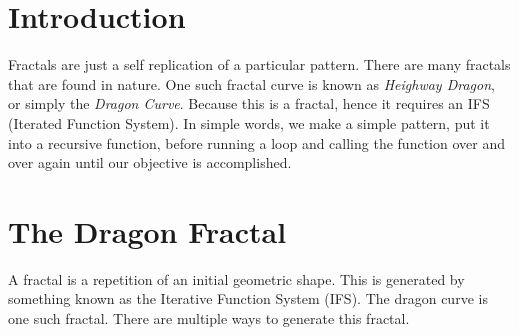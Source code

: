 \documentclass[cryptography,article,submit,moreauthors,pdftex]{Definitions/mdpi}
\begin{document}


\section{Introduction}
\begin{flushleft}
    Fractals are just a self replication of a particular pattern. There are many fractals that are found in nature. One such fractal curve is known as \textit{Heighway Dragon}, or simply the \textit{Dragon Curve}. Because this is a fractal, hence it requires an IFS (Iterated Function System). In simple words, we make a simple pattern, put it into a recursive function, before running a loop and calling the function over and over again until our objective is accomplished.
\end{flushleft}

\section{The Dragon Fractal}
\begin{flushleft}
        A fractal is a repetition of an initial geometric shape. This is generated by something known as the Iterative Function System (IFS). The dragon curve is one such fractal. There are multiple ways to generate this fractal. 
\end{flushleft}
\end{document}
